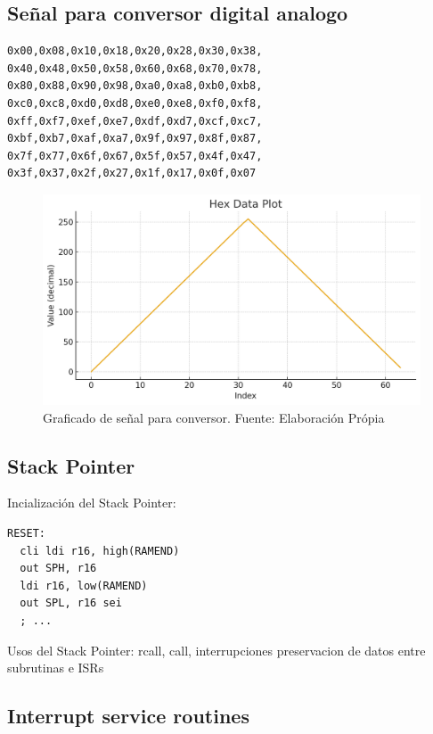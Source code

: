 \subsection{Señal para conversor digital analogo}\label{anexo:Senal_para_conversor_digital_analogo}
\begin{verbatim}
0x00,0x08,0x10,0x18,0x20,0x28,0x30,0x38,
0x40,0x48,0x50,0x58,0x60,0x68,0x70,0x78,
0x80,0x88,0x90,0x98,0xa0,0xa8,0xb0,0xb8,
0xc0,0xc8,0xd0,0xd8,0xe0,0xe8,0xf0,0xf8,
0xff,0xf7,0xef,0xe7,0xdf,0xd7,0xcf,0xc7,
0xbf,0xb7,0xaf,0xa7,0x9f,0x97,0x8f,0x87,
0x7f,0x77,0x6f,0x67,0x5f,0x57,0x4f,0x47,
0x3f,0x37,0x2f,0x27,0x1f,0x17,0x0f,0x07
\end{verbatim}

\begin{figure}[H]
  \centering
  \includegraphics[width=\linewidth]{./Anexos/Metodologia/DAC/Forma de onda.png}
  \caption{Graficado de señal para conversor. Fuente: Elaboración Própia}
  \label{fig:Conversor_waveform}
\end{figure}


\subsection{Stack Pointer}\label{anexo:Stack_Pointer}

Incialización del Stack Pointer:

\begin{verbatim}
RESET:
  cli ldi r16, high(RAMEND)
  out SPH, r16
  ldi r16, low(RAMEND)
  out SPL, r16 sei
  ; ...
\end{verbatim}

Usos del Stack Pointer: rcall, call, interrupciones
preservacion de datos entre subrutinas e ISRs

\subsection{Interrupt service routines}\label{anexo:Interrupt_Service_Routines}

